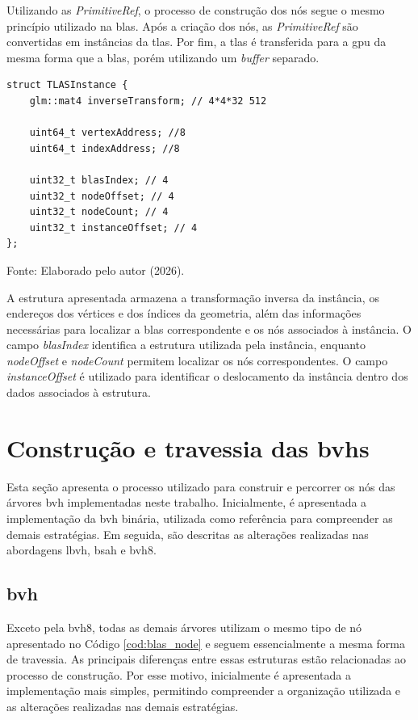 Utilizando as \textit{PrimitiveRef}, o processo de construção dos nós segue o mesmo princípio utilizado na \gls{blas}. Após a criação dos nós, as \textit{PrimitiveRef} são convertidas em instâncias da \gls{tlas}. Por fim, a \gls{tlas} é transferida para a \gls{gpu} da mesma forma que a \gls{blas}, porém utilizando um \textit{buffer} separado.

\begin{lstlisting}[caption={\textit{Struct} da instância da \gls{tlas}}, label={cod:tlas_instance}]
struct TLASInstance {
    glm::mat4 inverseTransform; // 4*4*32 512

    uint64_t vertexAddress; //8
    uint64_t indexAddress; //8

    uint32_t blasIndex; // 4
    uint32_t nodeOffset; // 4
    uint32_t nodeCount; // 4
    uint32_t instanceOffset; // 4
};
\end{lstlisting}
{\normalsize
Fonte: Elaborado pelo autor (2026).
}

A estrutura apresentada armazena a transformação inversa da instância, os endereços dos vértices e dos índices da geometria, além das informações necessárias para localizar a \gls{blas} correspondente e os nós associados à instância. O campo \textit{blasIndex} identifica a estrutura utilizada pela instância, enquanto \textit{nodeOffset} e \textit{nodeCount} permitem localizar os nós correspondentes. O campo \textit{instanceOffset} é utilizado para identificar o deslocamento da instância dentro dos dados associados à estrutura.

\section{Construção e travessia das \glspl{bvh}}

Esta seção apresenta o processo utilizado para construir e percorrer os nós das árvores \gls{bvh} implementadas neste trabalho. Inicialmente, é apresentada a implementação da \gls{bvh} binária, utilizada como referência para compreender as demais estratégias. Em seguida, são descritas as alterações realizadas nas abordagens \gls{lbvh}, \gls{bsah} e \gls{bvh8}.

\subsection{\gls{bvh}}

Exceto pela \gls{bvh8}, todas as demais árvores utilizam o mesmo tipo de nó apresentado no Código \ref{cod:blas_node} e seguem essencialmente a mesma forma de travessia. As principais diferenças entre essas estruturas estão relacionadas ao processo de construção. Por esse motivo, inicialmente é apresentada a implementação mais simples, permitindo compreender a organização utilizada e as alterações realizadas nas demais estratégias.

